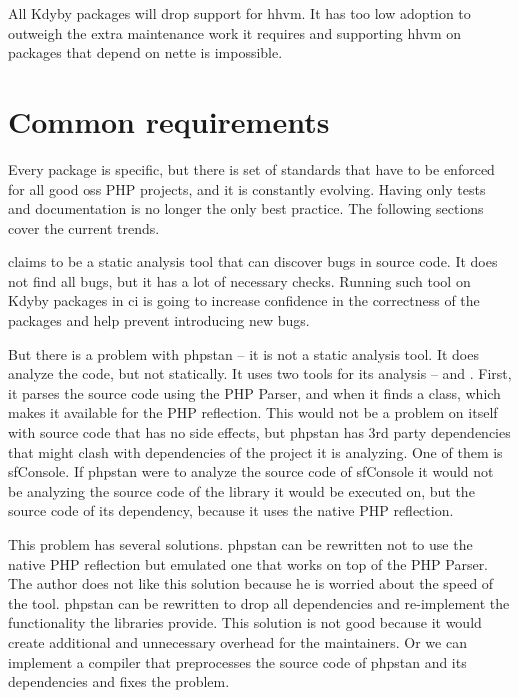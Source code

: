 All Kdyby packages will drop support for \gls{hhvm}. It has too low adoption to outweigh the extra maintenance work it requires and supporting \gls{hhvm} on packages that depend on \gls{nette} is impossible.

\section{Common requirements} \label{sec:roadmap:common}

Every package is specific, but there is set of standards that have to be enforced for all good \gls{oss} PHP projects, and it is constantly evolving. Having only tests and documentation is no longer the only best practice. The following sections cover the current trends.


 claims to be a static analysis tool that can discover bugs in source code. It does not find all bugs, but it has a lot of necessary checks. Running such tool on Kdyby packages in \gls{ci} is going to increase confidence in the correctness of the packages and help prevent introducing new bugs.

But there is a problem with \gls{phpstan} -- it is not a static analysis tool. It does analyze the code, but not statically. It uses two tools for its analysis --  and . First, it parses the source code using the PHP Parser, and when it finds a class,  which makes it available for the PHP reflection. This would not be a problem on itself with source code that has no side effects, but \gls{phpstan} has 3rd party dependencies that might clash with dependencies of the project it is analyzing. One of them is \gls{sfConsole}. If \gls{phpstan} were to analyze the source code of \gls{sfConsole} it would not be analyzing the source code of the library it would be executed on, but the source code of its dependency, because it uses the native PHP reflection.

This problem has several solutions. \gls{phpstan} can be rewritten not to use the native PHP reflection but emulated one that works on top of the PHP Parser. The author does not like this solution because he is worried about the speed of the tool. \gls{phpstan} can be rewritten to drop all dependencies and re-implement the functionality the libraries provide. This solution is not good because it would create additional and unnecessary overhead for the maintainers. Or we can implement a compiler that preprocesses the source code of \gls{phpstan} and its dependencies and fixes the problem.

